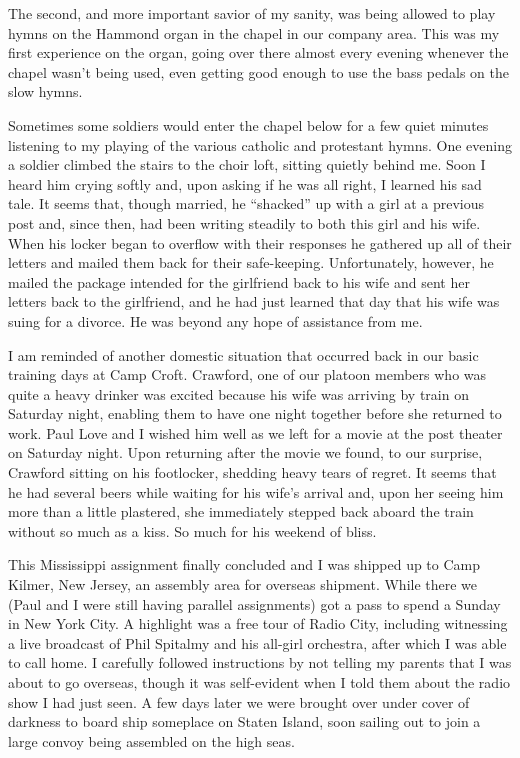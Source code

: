 \documentclass[../m3y]{subfiles}
\begin{document}
The second, and more important savior of my sanity, was being allowed to play hymns on the Hammond organ in the chapel in our company area. This was my first experience on the organ, going over there almost every evening whenever the chapel wasn't being used, even getting good enough to use the bass pedals on the slow hymns.

Sometimes some soldiers would enter the chapel below for a few quiet minutes listening to my playing of the various catholic and protestant hymns. One evening a soldier climbed the stairs to the choir loft, sitting quietly behind me. Soon I heard him crying softly and, upon asking if he was all right, I learned his sad tale. It seems that, though married, he ``shacked'' up with a girl at a previous post and, since then, had been writing steadily to both this girl and his wife. When his locker began to overflow with their responses he gathered up all of their letters and mailed them back for their safe-keeping. Unfortunately, however, he mailed the package intended for the girlfriend back to his wife and sent her letters back to the girlfriend, and he had just learned that day that his wife was suing for a divorce. He was beyond any hope of assistance from me.

I am reminded of another domestic situation that occurred back in our basic training days at Camp Croft. Crawford, one of our platoon members who was quite a heavy drinker was excited because his wife was arriving by train on Saturday night, enabling them to have one night together before she returned to work. Paul Love and I wished him well as we left for a movie at the post theater on Saturday night. Upon returning after the movie we found, to our surprise, Crawford sitting on his footlocker, shedding heavy tears of regret. It seems that he had several beers while waiting for his wife's arrival and, upon her seeing him more than a little plastered, she immediately stepped back aboard the train without so much as a kiss. So much for his weekend of bliss.

This Mississippi assignment finally concluded and I was shipped up to Camp Kilmer, New Jersey, an assembly area for overseas shipment. While there we (Paul and I were still having parallel assignments) got a pass to spend a Sunday in New York City. A highlight was a free tour of Radio City, including witnessing a live broadcast of Phil Spitalmy and his all-girl orchestra, after which I was able to call home. I carefully followed instructions by not telling my parents that I was about to go overseas, though it was self-evident when I told them about the radio show I had just seen. A few days later we were brought over under cover of darkness to board ship someplace on Staten Island, soon sailing out to join a large convoy being assembled on the high seas.
\end{document}
